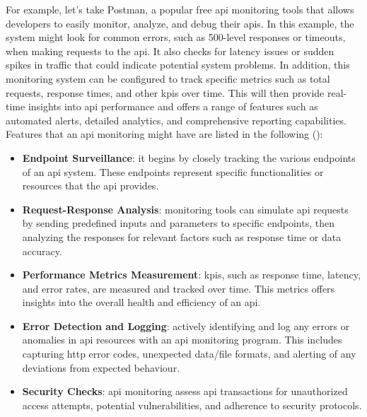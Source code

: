 \begin{multicols}{2}
      For example, let's take Postman, a popular free \acrshort{api} monitoring tools that allows developers to easily
      monitor, analyze, and debug their \acrshort{api}s. In this example, the system might look for common errors, such
      as 500-level responses or timeouts, when making requests to the \acrshort{api}. It also checks for latency issues
      or sudden spikes in traffic that could indicate potential system problems. In addition, this monitoring system can
      be configured to track specific metrics such as total requests, response times, and other \acrshort{kpi}s over time.
      This will then provide real-time insights into \acrshort{api} performance and offers a range of features such as
      automated alerts, detailed analytics, and comprehensive reporting capabilities. Features that an \acrshort{api}
      monitoring might have are listed in the following (\cite{postmanapimonitoring}):
      \begin{itemize}
            \item \textbf{Endpoint Surveillance}: it begins by closely tracking the various endpoints of an \acrshort{api}
                  system. These endpoints represent specific functionalities or resources that the \acrshort{api} provides.
            \item \textbf{Request-Response Analysis}: monitoring tools can simulate \acrshort{api} requests by sending
                  predefined inputs and parameters to specific endpoints, then analyzing the responses for relevant factors
                  such as response time or data accuracy.
            \item \textbf{Performance Metrics Measurement}: \acrshort{kpi}s, such as response time, latency, and error rates,
                  are measured and tracked over time. This metrics offers insights into the overall health and efficiency of
                  an \acrshort{api}.
            \item \textbf{Error Detection and Logging}: actively identifying and log any errors or anomalies in \acrshort{api}
                  resources with an \acrshort{api} monitoring program. This includes capturing \acrshort{http} error codes,
                  unexpected data/file formats, and alerting of any deviations from expected behaviour.
            \item \textbf{Security Checks}: \acrshort{api} monitoring assess \acrshort{api} transactions for unauthorized
                  access attempts, potential vulnerabilities, and adherence to security protocols.

\end{itemize}
\end{multicols}
